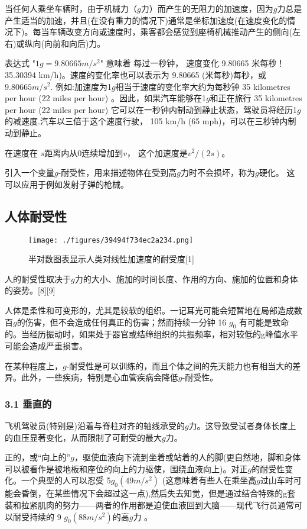 当任何人乘坐车辆时，由于机械力（$g$力）而产生的无阻力的加速度，因为$g$力总是产生适当的加速，并且(在没有重力的情况下)通常是坐标加速度(在速度变化的情况下)。每当车辆改变方向或速度时，乘客都会感觉到座椅机械推动产生的侧向(左右)或纵向(向前和向后)力。

表达式 "$1 g = 9.80665 m/s^2$" 意味着 每过一秒钟， 速度变化 9.80665 米每秒！35.30394 km/h)。速度的变化率也可以表示为 9.80665 (米每秒)每秒，或 $9.80665 m/s^2$. 例如:加速度为1$g$相当于速度的变化率大约为每秒钟 35 kilometres per hour (22 miles per hour) 。因此，如果汽车能够在1$g$和正在旅行 35 kilometres per hour (22 miles per hour) 它可以在一秒钟内制动到静止状态，驾驶员将经历1$g$的减速度.汽车以三倍于这个速度行驶， 105 km/h (65 mph)，可以在三秒钟内制动到静止。

在速度在 $s$距离内从0连续增加到$v$， 这个加速度是$v^2/(2s)$。

引入一个变量$g$-耐受性，用来描述物体在受到高$g$力时不会损坏，称为$g$硬化。 这可以应用于例如发射子弹的枪械。

\subsection{人体耐受性}
\begin{figure}[ht]
\centering
\texttt{[image: ./figures/39494f734ec2a234.png]}
\caption{半对数图表显示人类对线性加速度的耐受度[1]} \label{fig_GLI_2}
\end{figure}
人的耐受性取决于$g$力的大小、施加的时间长度、作用的方向、施加的位置和身体的姿势。[8][9]

人体是柔性和可变形的，尤其是较软的组织。一记耳光可能会短暂地在局部造成数百$g$的伤害，但不会造成任何真正的伤害；然而持续一分钟 16 $g_0$ 有可能是致命的。当经历振动时，如果处于器官或结缔组织的共振频率，相对较低的g峰值水平可能会造成严重损害。

在某种程度上，$g$-耐受性是可以训练的，而且个体之间的先天能力也有相当大的差异。此外，一些疾病，特别是心血管疾病会降低$g$-耐受性。

\subsubsection{3.1 垂直的}
飞机驾驶员(特别是)沿着与脊柱对齐的轴线承受的$g$力。这导致受试者身体长度上的血压显著变化，从而限制了可耐受的最大$g$力。

正的，或“向上的”$g$，驱使血液向下流到坐着或站着的人的脚(更自然地，脚和身体可以被看作是被地板和座位的向上的力驱使，围绕血液向上)。对正$g$的耐受性变化。一个典型的人可以忍受 5$g_0(49 m/s^2)$ (这意味着有些人在乘坐高$g$过山车时可能会昏倒，在某些情况下会超过这一点),然后失去知觉，但是通过结合特殊的g套装和拉紧肌肉的努力——两者的作用都是迫使血液回到大脑——现代飞行员通常可以耐受持续的 9 $g_0 (88 m/s^2)$的高$g$力 。

